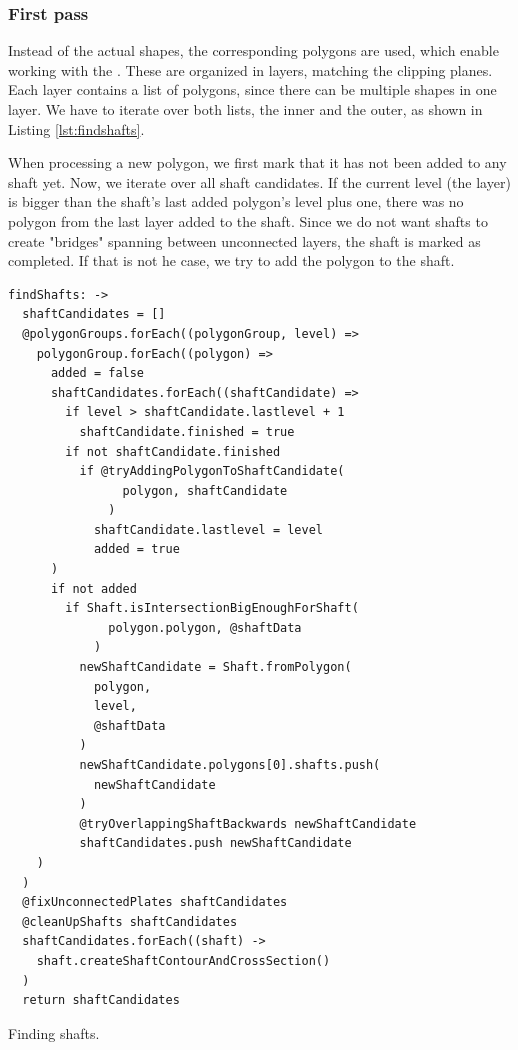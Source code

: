 \documentclass[../ClassicThesis.tex]{subfiles}
\begin{document}
\subsubsection{First pass}

Instead of the actual shapes, the corresponding polygons are used, which enable working with the \jsclipper. These are organized in layers, matching the clipping planes. Each layer contains a list of polygons, since there can be multiple shapes in one layer. We have to iterate over both lists, the inner and the outer, as shown in Listing \ref{lst:findshafts}.

When processing a new polygon, we first mark that it has not been added to any shaft yet. Now, we iterate over all shaft candidates. If the current level (the layer) is bigger than the shaft's last added polygon's level plus one, there was no polygon from the last layer added to the shaft. Since we do not want shafts to create "bridges" spanning between unconnected layers, the shaft is marked as completed. If that is not he case, we try to add the polygon to the shaft.

\begin{listing}[ht]
\begin{verbatim}
findShafts: ->
  shaftCandidates = []
  @polygonGroups.forEach((polygonGroup, level) =>
    polygonGroup.forEach((polygon) =>
      added = false
      shaftCandidates.forEach((shaftCandidate) =>
        if level > shaftCandidate.lastlevel + 1
          shaftCandidate.finished = true
        if not shaftCandidate.finished
          if @tryAddingPolygonToShaftCandidate(
                polygon, shaftCandidate
              )
            shaftCandidate.lastlevel = level
            added = true
      )
      if not added
        if Shaft.isIntersectionBigEnoughForShaft(
              polygon.polygon, @shaftData
            )
          newShaftCandidate = Shaft.fromPolygon(
            polygon,
            level,
            @shaftData
          )
          newShaftCandidate.polygons[0].shafts.push(
            newShaftCandidate
          )
          @tryOverlappingShaftBackwards newShaftCandidate
          shaftCandidates.push newShaftCandidate
    )
  )
  @fixUnconnectedPlates shaftCandidates
  @cleanUpShafts shaftCandidates
  shaftCandidates.forEach((shaft) ->
    shaft.createShaftContourAndCrossSection()
  )
  return shaftCandidates
\end{verbatim}
\caption{Finding shafts.}
\label{lst:findshafts}
\end{listing}
\end{document}

